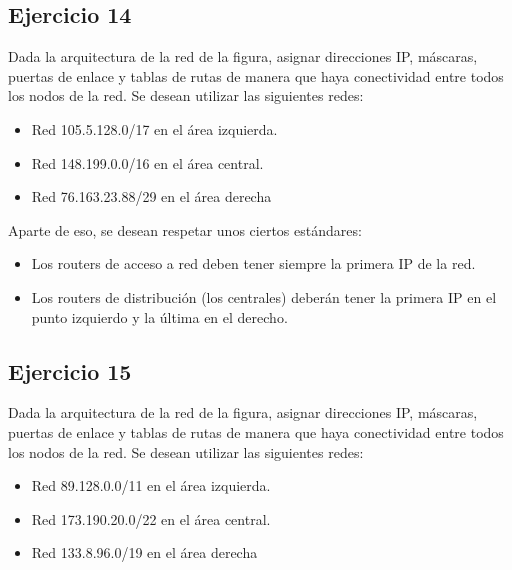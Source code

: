 \documentclass[letterpaper,10pt,spanish]{sphinxmanual}
\begin{document}
\subsection{Ejercicio 14}
\label{\detokenize{t2_integracion_elementos/ejercicios_subredes_ipv4/ejercicios_dos_router:ejercicio-14}}
\sphinxAtStartPar
Dada la arquitectura de la red de la figura, asignar direcciones IP, máscaras, puertas de enlace y tablas de rutas de manera que haya conectividad entre todos
los nodos de la red. Se desean utilizar las siguientes redes:
\begin{itemize}
\item {} 
\sphinxAtStartPar
Red 105.5.128.0/17 en el área izquierda.

\item {} 
\sphinxAtStartPar
Red 148.199.0.0/16 en el área central.

\item {} 
\sphinxAtStartPar
Red 76.163.23.88/29 en el área derecha

\end{itemize}

\begin{figure}[htbp]
\centering

\noindent{}
\end{figure}

\sphinxAtStartPar
Aparte de eso, se desean respetar unos ciertos estándares:
\begin{itemize}
\item {} 
\sphinxAtStartPar
Los routers de acceso a red deben tener siempre la primera IP de la red.

\item {} 
\sphinxAtStartPar
Los routers de distribución (los centrales) deberán tener la primera IP en el punto izquierdo y la última en el derecho.

\end{itemize}


\subsection{Ejercicio 15}
\label{\detokenize{t2_integracion_elementos/ejercicios_subredes_ipv4/ejercicios_dos_router:ejercicio-15}}
\sphinxAtStartPar
Dada la arquitectura de la red de la figura, asignar direcciones IP, máscaras, puertas de enlace y tablas de rutas de manera que haya conectividad entre todos
los nodos de la red. Se desean utilizar las siguientes redes:
\begin{itemize}
\item {} 
\sphinxAtStartPar
Red 89.128.0.0/11 en el área izquierda.

\item {} 
\sphinxAtStartPar
Red 173.190.20.0/22 en el área central.

\item {} 
\sphinxAtStartPar
Red 133.8.96.0/19 en el área derecha

\end{itemize}
\end{document}
